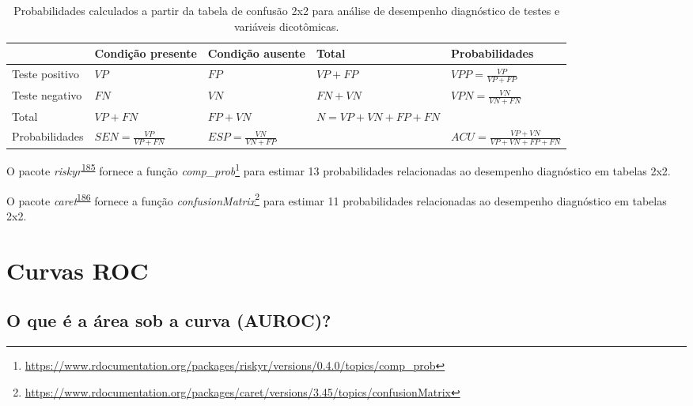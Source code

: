 \documentclass[
  a4paper,
]{book}
\renewcommand{\href}[2]{#2\footnote{\url{#1}}}
\newenvironment{infobox}[1]
  {
  \begin{itemize}
  \renewcommand{\labelitemi}{
    \raisebox{-.7\height}[0pt][0pt]{
      {\setkeys{Gin}{width=3em,keepaspectratio}
        \texttt{[image: \#1]}}
    }
  }
  \setlength{\fboxsep}{1em}
  \begin{blackbox}
  \item
  }
  {
  \end{blackbox}
  \end{itemize}
  }
\begin{document}
\begin{table}

\caption{\label{tab:crosstable-prob}Probabilidades calculados a partir da tabela de confusão 2x2 para análise de desempenho diagnóstico de testes e variáveis dicotômicas.}
\centering
\begin{tabu} to 
\toprule
\textbf{ } & \textbf{Condição presente} & \textbf{Condição ausente} & \textbf{Total} & \textbf{Probabilidades}\\
\midrule
Teste positivo & $VP$ & $FP$ & $VP+FP$ & $VPP = \frac{VP}{VP+FP}$\\
Teste negativo & $FN$ & $VN$ & $FN+VN$ & $VPN = \frac{VN}{VN+FN}$\\
Total & $VP+FN$ & $FP+VN$ & $N=VP+VN+FP+FN$ & \\
Probabilidades & $SEN = \frac{VP}{VP+FN}$ & $ESP = \frac{VN}{VN+FP}$ &  & $ACU = \frac{VP+VN}{VP+VN+FP+FN}$\\
\bottomrule
\end{tabu}
\end{table}

\begin{infobox}{images/Rlogo}
O pacote \emph{riskyr}\textsuperscript{\protect\hyperlink{ref-riskyr}{185}} fornece a função \href{https://www.rdocumentation.org/packages/riskyr/versions/0.4.0/topics/comp_prob}{\emph{comp\_prob}} para estimar 13 probabilidades relacionadas ao desempenho diagnóstico em tabelas 2x2.

\end{infobox}

\begin{infobox}{images/Rlogo}
O pacote \emph{caret}\textsuperscript{\protect\hyperlink{ref-caret}{186}} fornece a função \href{https://www.rdocumentation.org/packages/caret/versions/3.45/topics/confusionMatrix}{\emph{confusionMatrix}} para estimar 11 probabilidades relacionadas ao desempenho diagnóstico em tabelas 2x2.

\end{infobox}

\hypertarget{curvas-roc}{%
\section{Curvas ROC}\label{curvas-roc}}

\hypertarget{o-que-uxe9-a-uxe1rea-sob-a-curva-auroc}{%
\subsection{O que é a área sob a curva (AUROC)?}\label{o-que-uxe9-a-uxe1rea-sob-a-curva-auroc}}
\end{document}
